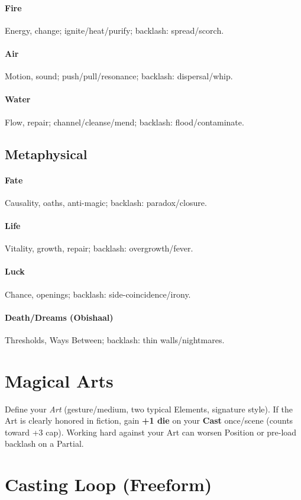 \paragraph{Fire} Energy, change; ignite/heat/purify; backlash: spread/scorch. \quad
\paragraph{Air} Motion, sound; push/pull/resonance; backlash: dispersal/whip. \quad
\paragraph{Water} Flow, repair; channel/cleanse/mend; backlash: flood/contaminate.

\subsection{Metaphysical}
\paragraph{Fate} Causality, oaths, anti-magic; backlash: paradox/closure. \quad
\paragraph{Life} Vitality, growth, repair; backlash: overgrowth/fever. \quad
\paragraph{Luck} Chance, openings; backlash: side-coincidence/irony. \quad
\paragraph{Death/Dreams (Obishaal)} Thresholds, Ways Between; backlash: thin walls/nightmares.

\section{Magical Arts}
\label{sec:magical-arts}

Define your \emph{Art} (gesture/medium, two typical Elements, signature style). If the Art is clearly honored in fiction, gain \textbf{+1 die} on your \textbf{Cast} once/scene (counts toward +3 cap). Working hard against your Art can worsen Position or pre-load backlash on a Partial.

\section{Casting Loop (Freeform)}
\label{sec:casting-loop}

